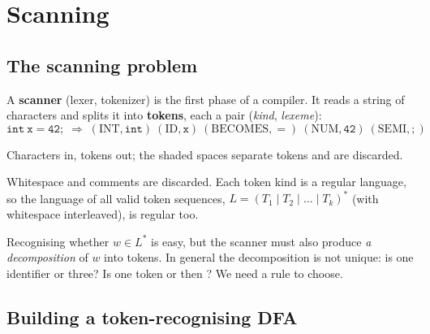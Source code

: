 \chapter{Scanning}

\section{The scanning problem}

A \textbf{scanner} (lexer, tokenizer) is the first phase of a compiler. It reads a string of
characters and splits it into \textbf{tokens}, each a pair (\emph{kind}, \emph{lexeme}):
\[
\mathtt{int\ x = 42;} \;\Longrightarrow\;
(\mathrm{INT},\mathtt{int})\ (\mathrm{ID},\mathtt{x})\ (\mathrm{BECOMES},\mathtt{=})\
(\mathrm{NUM},\mathtt{42})\ (\mathrm{SEMI},\mathtt{;})
\]
\begin{center}

\small Characters in, tokens out; the shaded spaces separate tokens and are discarded.
\end{center}
Whitespace and comments are discarded. Each token kind is a regular language, so the
language of all valid token sequences, $L = (T_1 \mid T_2 \mid \dots \mid T_k)^*$ (with
whitespace interleaved), is regular too.

\begin{important}
Recognising whether $w \in L^*$ is easy, but the scanner must also produce \emph{a
decomposition} of $w$ into tokens. In general the decomposition is not unique: is
\code{abc} one identifier or three? Is \code{>=} one token or \code{>} then \code{=}? We need
a rule to choose.
\end{important}

\section{Building a token-recognising DFA}


